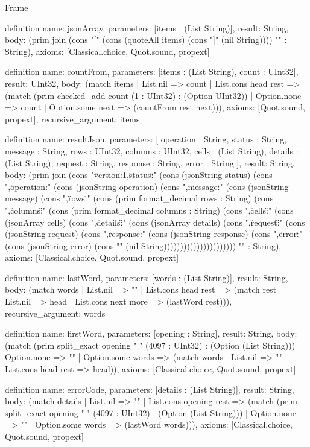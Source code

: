 \begin{lexlean}{Frame}
\begin{semanticmodule}
definition{
  name: jsonArray,
  parameters: [items : (List String)],
  result: String,
  body: (prim join (cons "[" (cons (quoteAll items) (cons "]" (nil String)))) "" : String),
  axioms: [Classical.choice, Quot.sound, propext]
}

definition{
  name: countFrom,
  parameters: [items : (List String), count : UInt32],
  result: UInt32,
  body: (match items
    | List.nil => count
    | List.cons head rest => (match (prim checked_add count (1 : UInt32) : (Option UInt32))
      | Option.none => count
      | Option.some next => (countFrom rest next))),
  axioms: [Quot.sound, propext],
  recursive_argument: items
}

definition{
  name: resultJson,
  parameters: [
    operation : String,
    status : String,
    message : String,
    rows : UInt32,
    columns : UInt32,
    cells : (List String),
    details : (List String),
    request : String,
    response : String,
    error : String
  ],
  result: String,
  body: (prim join (cons "{\"version\":1,\"status\":" (cons (jsonString status) (cons ",\"operation\":" (cons (jsonString operation) (cons ",\"message\":" (cons (jsonString message) (cons ",\"rows\":" (cons (prim format_decimal rows : String) (cons ",\"columns\":" (cons (prim format_decimal columns : String) (cons ",\"cells\":" (cons (jsonArray cells) (cons ",\"details\":" (cons (jsonArray details) (cons ",\"request\":" (cons (jsonString request) (cons ",\"response\":" (cons (jsonString response) (cons ",\"error\":" (cons (jsonString error) (cons "}" (nil String)))))))))))))))))))))) "" : String),
  axioms: [Classical.choice, Quot.sound, propext]
}

definition{
  name: lastWord,
  parameters: [words : (List String)],
  result: String,
  body: (match words
    | List.nil => ""
    | List.cons head rest => (match rest
      | List.nil => head
      | List.cons next more => (lastWord rest))),
  recursive_argument: words
}

definition{
  name: firstWord,
  parameters: [opening : String],
  result: String,
  body: (match (prim split_exact opening " " (4097 : UInt32) : (Option (List String)))
    | Option.none => ""
    | Option.some words => (match words | List.nil => "" | List.cons head rest => head)),
  axioms: [Classical.choice, Quot.sound, propext]
}

definition{
  name: errorCode,
  parameters: [details : (List String)],
  result: String,
  body: (match details
    | List.nil => ""
    | List.cons opening rest => (match (prim split_exact opening " " (4097 : UInt32) : (Option (List String)))
      | Option.none => ""
      | Option.some words => (lastWord words))),
  axioms: [Classical.choice, Quot.sound, propext]
}


\end{semanticmodule}
\end{lexlean}

